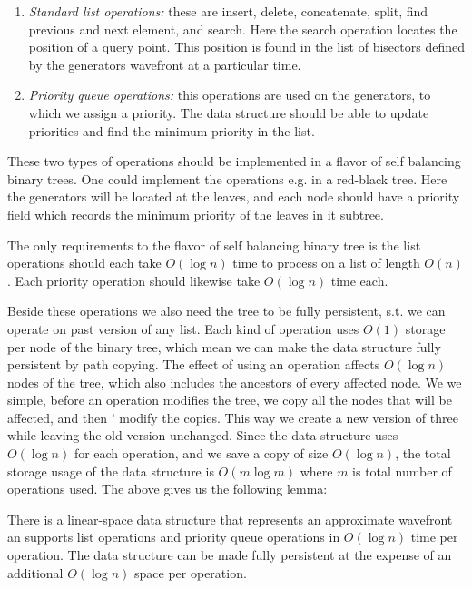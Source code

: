 \begin{enumerate}
\item \textit{Standard list operations:} these are insert, delete, concatenate, split, find previous 
			  and next element, and search. Here the search operation locates the position of a query 
              point. This position is found in the list of bisectors defined by the generators 
              wavefront at a particular time. 
\item \textit{Priority queue operations:} this operations are used on the generators, to which we 
			  assign a priority. The data structure should be able to  update priorities and find the 
              minimum priority in the list.
\end{enumerate}

These two types of operations should be implemented in a flavor of self balancing binary trees. One 
could implement the operations e.g. in a red-black tree. Here the generators will be located at the 
leaves, and each node should have a priority field which records the minimum priority of the leaves in 
it subtree.

The only requirements to the flavor of self balancing binary tree is the list operations should each 
take $O(\log n)$ time to process on a list of length $O(n)$. Each priority operation should likewise 
take $O(\log n)$ time each. 

Beside these operations we also need the tree to be fully persistent, s.t. we can operate on past 
version of any list. Each kind of operation uses $O(1)$ storage per node of the binary tree, which 
mean we can make the data structure fully persistent by path copying. The effect of using an operation 
affects $O(\log n)$ nodes of the tree, which also includes the ancestors of every affected node. We we 
simple, before an operation modifies the tree, we copy all the nodes that will be affected, and then '
modify the copies. This way we create a new version of three while leaving the old version unchanged.
Since the data structure uses $O(\log n)$ for each operation, and we save a copy of size $O(\log n)$, 
the total storage usage of the data structure is $O(m \log m)$ where $m$ is total number of operations 
used. The above gives us the following lemma:

\begin{Lemma} 
There is a linear-space data structure that represents an approximate wavefront an supports list 
operations and priority queue operations in $O(\log n)$ time per operation. The data structure can be 
made fully persistent at the expense of an additional $O(\log n)$ space per operation.
\end{Lemma}

